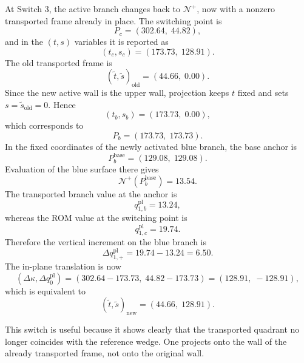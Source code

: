 \documentclass[11pt,a4paper]{article}
\begin{document}
At Switch 3, the active branch changes back to \(\mathcal{N}^{+}\), now with a nonzero transported frame already in place. The switching point is
\begin{equation}
P_c=(302.64,\;44.82),
\end{equation}
and in the \((t,s)\) variables it is reported as
\begin{equation}
(t_c,s_c)=(173.73,\;128.91).
\end{equation}
The old transported frame is
\begin{equation}
(\tilde t,\tilde s)_{\mathrm{old}}=(44.66,\;0.00).
\end{equation}
Since the new active wall is the upper wall, projection keeps \(t\) fixed and sets \(s=\tilde s_{\mathrm{old}}=0\). Hence
\begin{equation}
(t_b,s_b)=(173.73,\;0.00),
\end{equation}
which corresponds to
\begin{equation}
P_b=(173.73,\;173.73).
\end{equation}
In the fixed coordinates of the newly activated blue branch, the base anchor is
\begin{equation}
P_b^{\mathrm{base}}=(129.08,\;129.08).
\end{equation}
Evaluation of the blue surface there gives
\begin{equation}
\mathcal{N}^{+}(P_b^{\mathrm{base}})=13.54.
\end{equation}
The transported branch value at the anchor is
\begin{equation}
q^{\mathrm{pl}}_{1,b}=13.24,
\end{equation}
whereas the ROM value at the switching point is
\begin{equation}
q^{\mathrm{pl}}_{1,c}=19.74.
\end{equation}
Therefore the vertical increment on the blue branch is
\begin{equation}
\Delta q^{\mathrm{pl}}_{1,+}
=
19.74-13.24
=
6.50.
\end{equation}
The in-plane translation is now
\begin{equation}
(\Delta \kappa,\Delta q^{\mathrm{pl}}_0)
=
(302.64-173.73,\;44.82-173.73)
=
(128.91,\;-128.91),
\end{equation}
which is equivalent to
\begin{equation}
(\tilde t,\tilde s)_{\mathrm{new}}=(44.66,\;128.91).
\end{equation}

This switch is useful because it shows clearly that the transported quadrant no longer coincides with the reference wedge. One projects onto the wall of the already transported frame, not onto the original wall.
\end{document}
